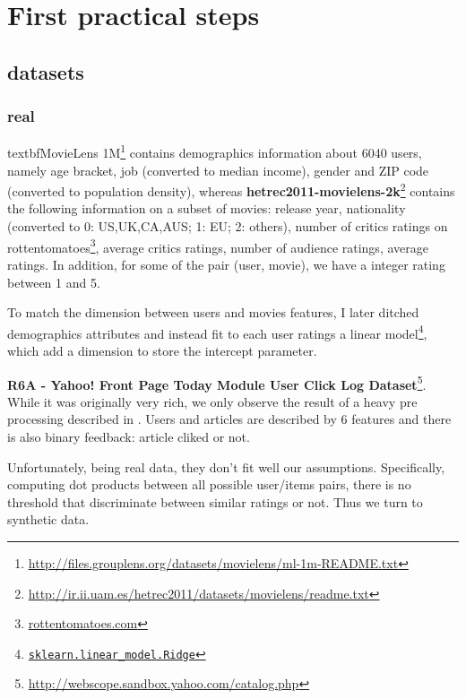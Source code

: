 \section{First practical steps}


\subsection{datasets}

\subsubsection{real}

textbf{MovieLens 1M}\footnote{%
\href{http://files.grouplens.org/datasets/movielens/ml-1m-README.txt}%
{http://files.grouplens.org/datasets/movielens/ml-1m-README.txt}} contains
demographics information about 6040 users, namely age bracket, job (converted
to median income), gender and ZIP code (converted to population density),
whereas \textbf{hetrec2011-movielens-2k}\footnote{%
\href{http://ir.ii.uam.es/hetrec2011/datasets/movielens/readme.txt}%
{http://ir.ii.uam.es/hetrec2011/datasets/movielens/readme.txt}} contains the
following information on a subset of movies: release year, nationality
(converted to 0: US,UK,CA,AUS; 1: EU; 2: others), number of critics ratings on
rottentomatoes\footnote{\href{http://www.rottentomatoes.com/}{rottentomatoes.com}},
average critics ratings, number of audience ratings, average ratings. In
addition, for some of the pair (user, movie), we have a integer rating between
1 and 5.

To match the dimension between users and movies features, I later ditched
demographics attributes and instead fit to each user ratings a linear
model\footnote{\href{http://scikit-learn.org/stable/modules/generated/sklearn.linear_model.Ridge.html}%
{\texttt{sklearn.linear\_model.Ridge}}}, which add a dimension to store the
intercept parameter.

\textbf{R6A - Yahoo! Front Page Today Module User Click Log Dataset}\footnote{%
\href{http://webscope.sandbox.yahoo.com/catalog.php?datatype=r}%
{http://webscope.sandbox.yahoo.com/catalog.php}}.
While it was originally very rich, we only observe the result of a heavy pre
processing described in \autocite{YahooNews09}. Users and articles are
described by 6 features and there is also binary feedback: article cliked or
not.

Unfortunately, being real data, they don't fit well our assumptions.
Specifically, computing dot products between all possible user/items pairs,
there is no threshold that discriminate between similar ratings or not. Thus
we turn to synthetic data.

